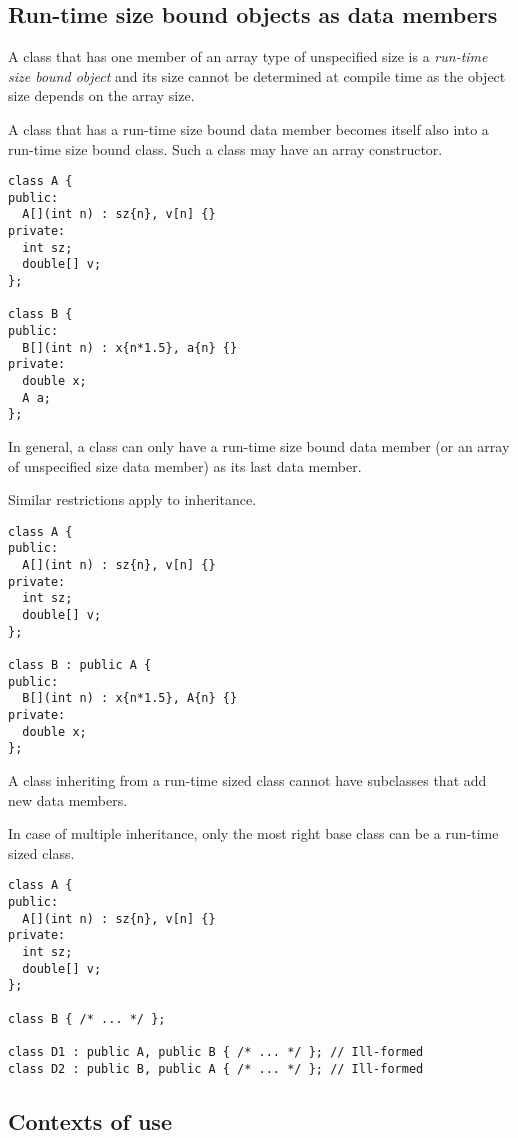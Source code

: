 \subsection{Run-time size bound objects as data members}

A class that has one member of an array type of unspecified size is a
\emph{run-time size bound object} and its size cannot be determined at compile
time as the object size depends on the array size.

A class that has a run-time size bound data member becomes itself also into a
run-time size bound class. Such a class may have an array constructor.

\begin{lstlisting}
class A {
public:
  A[](int n) : sz{n}, v[n] {}
private:
  int sz;
  double[] v;
};

class B {
public:
  B[](int n) : x{n*1.5}, a{n} {}
private:
  double x;
  A a;
};
\end{lstlisting}

In general, a class can only have a run-time size bound data member (or 
an array of unspecified size data member) as its last data member. 

Similar restrictions apply to inheritance.

\begin{lstlisting}
class A {
public:
  A[](int n) : sz{n}, v[n] {}
private:
  int sz;
  double[] v;
};

class B : public A {
public:
  B[](int n) : x{n*1.5}, A{n} {}
private:
  double x;
};
\end{lstlisting}

A class inheriting from a run-time sized class cannot have subclasses that add new data members.

In case of multiple inheritance, only the most right base class can be a run-time sized class.

\begin{lstlisting}
class A {
public:
  A[](int n) : sz{n}, v[n] {}
private:
  int sz;
  double[] v;
};

class B { /* ... */ };

class D1 : public A, public B { /* ... */ }; // Ill-formed
class D2 : public B, public A { /* ... */ }; // Ill-formed
\end{lstlisting}

\subsection{Contexts of use}

